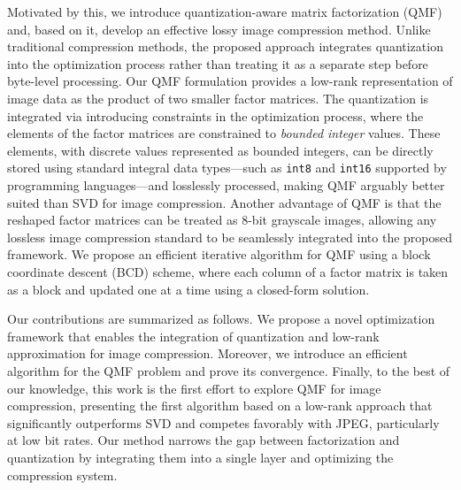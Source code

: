 Motivated by this, we introduce quantization-aware matrix factorization (QMF) and, based on it, develop an effective lossy image compression method. Unlike traditional compression methods, the proposed approach integrates quantization into the optimization process rather than treating it as a separate step before byte-level processing. Our QMF formulation provides a low-rank representation of image data as the product of two smaller factor matrices. The quantization is integrated via introducing constraints in the optimization process, where the elements of the factor matrices are constrained to \emph{bounded integer} values. These elements, with discrete values represented as bounded integers, can be directly stored using standard integral data types---such as \texttt{int8} and \texttt{int16} supported by programming languages---and losslessly processed, making QMF arguably better suited than SVD for image compression. Another advantage of QMF is that the reshaped factor matrices can be treated as 8-bit grayscale images, allowing any lossless image compression standard to be seamlessly integrated into the proposed framework. We propose an efficient iterative algorithm for QMF using a block coordinate descent (BCD) scheme, where each column of a factor matrix is taken as a block and updated one at a time using a closed-form solution.

Our contributions are summarized as follows. We propose a novel optimization framework that enables the integration of quantization and low-rank approximation for image compression. Moreover, we introduce an efficient algorithm for the QMF problem and prove its convergence. Finally, to the best of our knowledge, this work is the first effort to explore QMF for image compression, presenting the first algorithm based on a low-rank approach that significantly outperforms SVD and competes favorably with JPEG, particularly at low bit rates. Our method narrows the gap between factorization and quantization by integrating them into a single layer and optimizing the compression system.